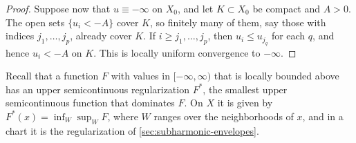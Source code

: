 \begin{proof}
Suppose now that $u\equiv-\infty$ on $X_0$, and let $K\subset X_0$ be compact and $A>0$. The open sets $\{u_i<-A\}$ cover $K$, so finitely many of them, say those with indices $j_1,\ldots,j_p$, already cover $K$. If $i\geq j_1,\ldots,j_p$, then $u_i\leq u_{j_q}$ for each $q$, and hence $u_i<-A$ on $K$. This is locally uniform convergence to $-\infty$.
\end{proof}

Recall that a function $F$ with values in $[-\infty,\infty)$ that is locally bounded above has an upper semicontinuous regularization $F^*$, the smallest upper semicontinuous function that dominates $F$. On $X$ it is given by $F^*(x)=\inf_W\sup_WF$, where $W$ ranges over the neighborhoods of $x$, and in a chart it is the regularization of \cref{sec:subharmonic-envelopes}.

